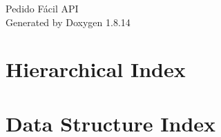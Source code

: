 \documentclass[twoside]{book}
\newcommand{\+}{\discretionary{\mbox{\scriptsize$\hookleftarrow$}}{}{}}
\newcommand{\clearemptydoublepage}{%
  \newpage{\pagestyle{empty}\cleardoublepage}%
}
\begin{document}
\hypersetup{pageanchor=false,
             bookmarksnumbered=true,
             pdfencoding=unicode
            }
\begin{titlepage}
\vspace*{7cm}
\begin{center}%
{\Large Pedido Fácil A\+PI }\\
\vspace*{1cm}
{\large Generated by Doxygen 1.8.14}\\
\end{center}
\end{titlepage}
\clearemptydoublepage
{}
\tableofcontents
\clearemptydoublepage
{}
\hypersetup{pageanchor=true}

\chapter{Hierarchical Index}

\chapter{Data Structure Index}

\end{document}

